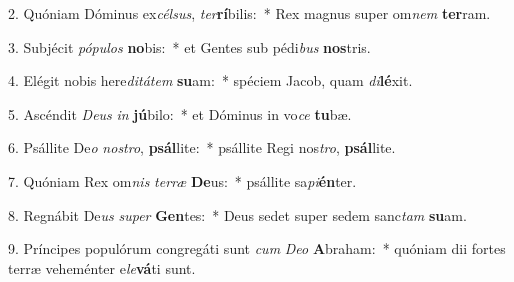 2. Quóniam Dóminus ex\textit{cél}\textit{sus}, \textit{ter}\textbf{rí}bilis:~*  Rex magnus super om\textit{nem} \textbf{ter}ram.\

3. Subjécit \textit{pó}\textit{pu}\textit{los} \textbf{no}bis:~*  et Gentes sub pédi\textit{bus} \textbf{nos}tris.\

4. Elégit nobis here\textit{di}\textit{tá}\textit{tem} \textbf{su}am:~*  spéciem Jacob, quam \textit{di}\textbf{lé}xit.\

5. Ascéndit \textit{De}\textit{us} \textit{in} \textbf{jú}bilo:~*  et Dóminus in vo\textit{ce} \textbf{tu}bæ.\

6. Psállite De\textit{o} \textit{nos}\textit{tro}, \textbf{psál}lite:~*  psállite Regi nos\textit{tro}, \textbf{psál}lite.\

7. Quóniam Rex om\textit{nis} \textit{ter}\textit{ræ} \textbf{De}us:~*  psállite sa\textit{pi}\textbf{én}ter.\

8. Regnábit De\textit{us} \textit{su}\textit{per} \textbf{Gen}tes:~*  Deus sedet super sedem sanc\textit{tam} \textbf{su}am.\

9. Príncipes populórum congregáti sunt \textit{cum} \textit{De}\textit{o} \textbf{A}braham:~*  quóniam dii fortes terræ veheménter e\textit{le}\textbf{vá}ti sunt.\

